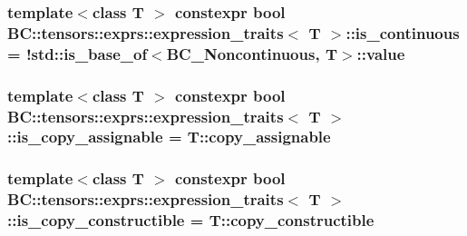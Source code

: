 \subsubsection[{\texorpdfstring{is\+\_\+continuous}{is_continuous}}]{\setlength{\rightskip}{0pt plus 5cm}template$<$class T $>$ constexpr bool {\bf B\+C\+::tensors\+::exprs\+::expression\+\_\+traits}$<$ T $>$\+::is\+\_\+continuous = !std\+::is\+\_\+base\+\_\+of$<${\bf B\+C\+\_\+\+Noncontinuous}, T$>$\+::value\hspace{0.3cm}{\ttfamily [static]}}\hypertarget{structBC_1_1tensors_1_1exprs_1_1expression__traits_a25f42c4b0aacb8dbb3f7768f4190abdf}{}\label{structBC_1_1tensors_1_1exprs_1_1expression__traits_a25f42c4b0aacb8dbb3f7768f4190abdf}
\subsubsection[{\texorpdfstring{is\+\_\+copy\+\_\+assignable}{is_copy_assignable}}]{\setlength{\rightskip}{0pt plus 5cm}template$<$class T $>$ constexpr bool {\bf B\+C\+::tensors\+::exprs\+::expression\+\_\+traits}$<$ T $>$\+::is\+\_\+copy\+\_\+assignable = T\+::copy\+\_\+assignable\hspace{0.3cm}{\ttfamily [static]}}\hypertarget{structBC_1_1tensors_1_1exprs_1_1expression__traits_a8e3c18748968740ef7a8526950d692c9}{}\label{structBC_1_1tensors_1_1exprs_1_1expression__traits_a8e3c18748968740ef7a8526950d692c9}
\subsubsection[{\texorpdfstring{is\+\_\+copy\+\_\+constructible}{is_copy_constructible}}]{\setlength{\rightskip}{0pt plus 5cm}template$<$class T $>$ constexpr bool {\bf B\+C\+::tensors\+::exprs\+::expression\+\_\+traits}$<$ T $>$\+::is\+\_\+copy\+\_\+constructible = T\+::copy\+\_\+constructible\hspace{0.3cm}{\ttfamily [static]}}\hypertarget{structBC_1_1tensors_1_1exprs_1_1expression__traits_a6ce7acf8f9730b988b165e980a04f414}{}\label{structBC_1_1tensors_1_1exprs_1_1expression__traits_a6ce7acf8f9730b988b165e980a04f414}
